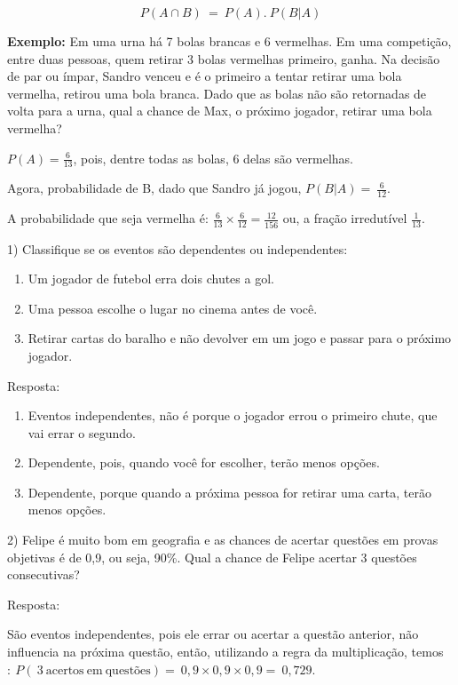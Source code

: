 {{{{{{{{{{{{{\[P(A \cap B)\  = \ P(A).\ P(B|A)\]

\textbf{Exemplo:} Em uma urna há 7 bolas brancas e 6 vermelhas. Em uma
competição, entre duas pessoas, quem retirar 3 bolas vermelhas primeiro,
ganha. Na decisão de par ou ímpar, Sandro venceu e é o primeiro a tentar
retirar uma bola vermelha, retirou uma bola branca. Dado que as bolas
não são retornadas de volta para a urna, qual a chance de Max, o próximo
jogador, retirar uma bola vermelha?

\(P(A) = \frac{6}{13}\), pois, dentre todas as bolas, 6 delas são
vermelhas.

Agora, probabilidade de B, dado que Sandro já jogou,
\(P(B|A) = \ \frac{6}{12}\).

A probabilidade que seja vermelha é:
\(\frac{6}{13} \times \frac{6}{12} = \frac{12}{156}\) ou, a fração
irredutível \(\frac{1}{13}\).


1) Classifique se os eventos são dependentes ou independentes:

\begin{enumerate}
\def\labelenumi{\alph{enumi})}
\item
  Um jogador de futebol erra dois chutes a gol.
\item
  Uma pessoa escolhe o lugar no cinema antes de você.
\item
  Retirar cartas do baralho e não devolver em um jogo e passar para o
  próximo jogador.
\end{enumerate}

Resposta:

\begin{enumerate}
\def\labelenumi{\alph{enumi})}
\item
  Eventos independentes, não é porque o jogador errou o primeiro chute,
  que vai errar o segundo.
\item
  Dependente, pois, quando você for escolher, terão menos opções.
\item
  Dependente, porque quando a próxima pessoa for retirar uma carta,
  terão menos opções.
\end{enumerate}

2) Felipe é muito bom em geografia e as chances de acertar questões em
provas objetivas é de 0,9, ou seja, 90\%. Qual a chance de Felipe
acertar 3 questões consecutivas?

Resposta:

São eventos independentes, pois ele errar ou acertar a questão anterior,
não influencia na próxima questão, então, utilizando a regra da
multiplicação,
temos\(:\ P(\ 3\ \text{acertos}\ \text{em}\ \text{quest}õ\text{es}) = \ 0,9 \times 0,9 \times 0,9 = \ 0,729.\)

}}}}}}}}}}}}}
